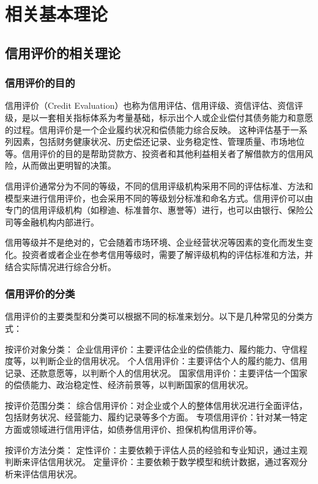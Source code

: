 
\chapter{相关基本理论}
\section{信用评价的相关理论}
\subsection{信用评价的目的}
信用评价（Credit Evaluation）也称为信用评估、信用评级、资信评估、资信评级，是以一套相关指标体系为考量基础，标示出个人或企业偿付其债务能力和意愿的过程。信用评价是一个企业履约状况和偿债能力综合反映。
这种评估基于一系列因素，包括财务健康状况、历史偿还记录、业务稳定性、管理质量、市场地位等。信用评价的目的是帮助贷款方、投资者和其他利益相关者了解借款方的信用风险，从而做出更明智的决策。

信用评价通常分为不同的等级，不同的信用评级机构采用不同的评估标准、方法和模型来进行信用评价，也会采用不同的等级划分标准和命名方式。信用评价可以由专门的信用评级机构（如穆迪、标准普尔、惠誉等）进行，也可以由银行、保险公司等金融机构内部进行。

信用等级并不是绝对的，它会随着市场环境、企业经营状况等因素的变化而发生变化。投资者或者企业在参考信用等级时，需要了解评级机构的评估标准和方法，并结合实际情况进行综合分析。
 
\subsection{信用评价的分类}

信用评价的主要类型和分类可以根据不同的标准来划分。以下是几种常见的分类方式：

按评价对象分类：
企业信用评价：主要评估企业的偿债能力、履约能力、守信程度等，以判断企业的信用状况。
个人信用评价：主要评估个人的履约能力、信用记录、还款意愿等，以判断个人的信用状况。
国家信用评价：主要评估一个国家的偿债能力、政治稳定性、经济前景等，以判断国家的信用状况。

按评价范围分类：
综合信用评价：对企业或个人的整体信用状况进行全面评估，包括财务状况、经营能力、履约记录等多个方面。
专项信用评价：针对某一特定方面或领域进行信用评估，如债券信用评价、担保机构信用评价等。

按评价方法分类：
定性评价：主要依赖于评估人员的经验和专业知识，通过主观判断来评估信用状况。
定量评价：主要依赖于数学模型和统计数据，通过客观分析来评估信用状况。

